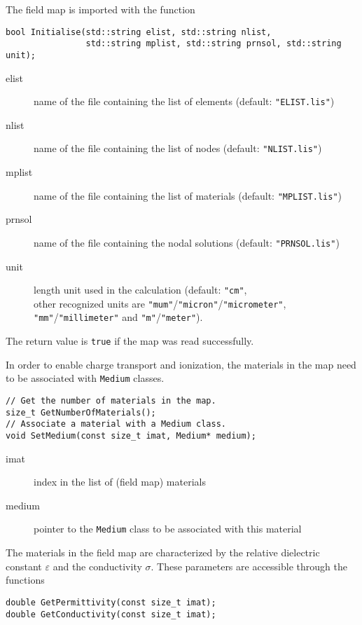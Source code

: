 The field map is imported with the function
\begin{lstlisting}
bool Initialise(std::string elist, std::string nlist,
                std::string mplist, std::string prnsol, std::string unit);
\end{lstlisting}
\begin{description}
  \item[elist]
  name of the file containing the list of elements 
  (default: \texttt{"ELIST.lis"})
  \item[nlist]
  name of the file containing the list of nodes
  (default: \texttt{"NLIST.lis"})
  \item[mplist]
  name of the file containing the list of materials
  (default: \texttt{"MPLIST.lis"})
  \item[prnsol]
  name of the file containing the nodal solutions
  (default: \texttt{"PRNSOL.lis"})
  \item[unit]
  length unit used in the calculation (default: \texttt{"cm"}, \\ 
  other recognized units are 
  \texttt{"mum"}/\texttt{"micron"}/\texttt{"micrometer"},
  \texttt{"mm"}/\texttt{"millimeter"} and 
  \texttt{"m"}/\texttt{"meter"}).
\end{description}
The return value is \texttt{true} if the map was read successfully.

In order to enable charge transport and ionization,
the materials in the map need to be associated with \texttt{Medium} classes.
\begin{lstlisting}
// Get the number of materials in the map.
size_t GetNumberOfMaterials();
// Associate a material with a Medium class.
void SetMedium(const size_t imat, Medium* medium);
\end{lstlisting}
\begin{description}
\item[imat]
index in the list of (field map) materials
\item[medium]
pointer to the \texttt{Medium} class to be associated with this material
\end{description}

The materials in the field map are characterized by the 
relative dielectric constant \(\varepsilon\) and the 
conductivity \(\sigma\). 
These parameters are accessible through the functions
\begin{lstlisting}
double GetPermittivity(const size_t imat);
double GetConductivity(const size_t imat);
\end{lstlisting}

